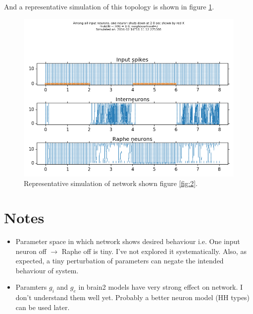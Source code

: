 \documentclass[]{article}
\begin{document}
And a representative simulation of this topology is shown in figure
\ref{fig:simulation2}.

\begin{figure}[ht!]
\begin{center}
    \includegraphics[width=1\textwidth]{./_snapshots/minimal_network.png}
\end{center}
\caption{Representative simulation of network shown figure \ref{fig:2}.}
\label{fig:simulation2}
\end{figure}

\section{Notes}
\label{sec:notes}

\begin{itemize}
    \item Parameter space in which network shows desired behaviour i.e. One
        input neuron off $\rightarrow$ Raphe off is tiny. I've not explored it
        systematically. Also, as expected, a tiny perturbation of parameters can
        negate the intended behaviour of system.
    \item Paramters $g_i$ and $g_e$ in brain2 models have very strong effect on
        network. I don't understand them well yet. Probably a better neuron
        model (HH types) can be used later.
\end{itemize}
\end{document}
